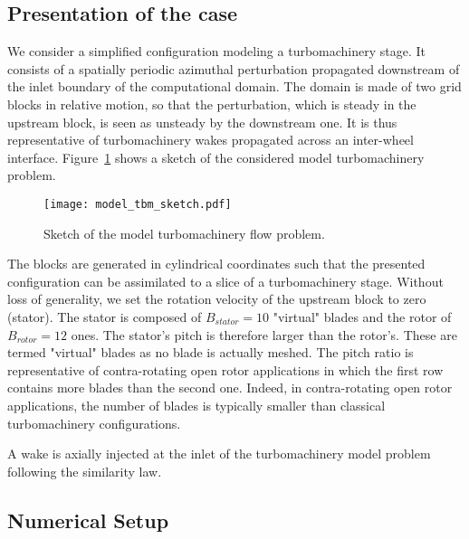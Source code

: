 
\subsection{Presentation of the case}

We consider a simplified 
configuration modeling a turbomachinery 
stage. It consists of a spatially 
periodic azimuthal perturbation propagated downstream 
of the inlet boundary of the computational domain. 
The domain is made of two grid blocks in relative 
motion, so that the perturbation, which is steady 
in the upstream block, is seen as unsteady by the 
downstream one.
It is thus representative of 
turbomachinery wakes propagated across an inter-wheel interface.
Figure~\ref{fig:model_tbm_sketch} shows a sketch
of the considered model turbomachinery problem.
\begin{figure}[htp]
  \centering
  \texttt{[image: model\_tbm\_sketch.pdf]}
  \caption{Sketch of the model turbomachinery flow problem.}
  \label{fig:model_tbm_sketch}
\end{figure}

The blocks are generated in cylindrical
coordinates such that the presented configuration
can be assimilated to a slice of 
a turbomachinery stage.
Without loss of generality, 
we set the rotation velocity of the upstream block to zero (stator). 
The stator is composed of $B_{stator} = 10$
"virtual" blades and the rotor of $B_{rotor} = 12$ ones.
The stator's pitch is therefore larger than the rotor's.
These are termed "virtual" blades as no blade is actually meshed.
The pitch ratio is representative of 
contra-rotating open rotor applications in which 
the first row contains more blades 
than the second one. Indeed, in
contra-rotating open rotor applications, the number
of blades is typically smaller than classical
turbomachinery configurations.

A wake is axially injected at the inlet of the
turbomachinery model problem following the \citet{Lakshminarayana1980}
similarity law.



\subsection{Numerical Setup}

